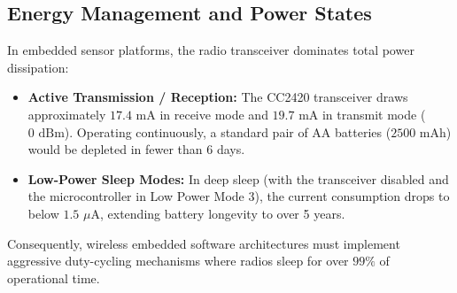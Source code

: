 \begin{table}[htbp]
\centering
\caption{Architectural comparison of embedded wireless sensor and IoT hardware platforms.}
\label{tab:embedded_boards_comparison}
\end{table}

\subsection{Energy Management and Power States}
In embedded sensor platforms, the radio transceiver dominates total power dissipation:
\begin{itemize}
    \item \textbf{Active Transmission / Reception:} The CC2420 transceiver draws approximately $17.4\text{~mA}$ in receive mode and $19.7\text{~mA}$ in transmit mode ($0\text{~dBm}$). Operating continuously, a standard pair of AA batteries ($2500\text{~mAh}$) would be depleted in fewer than 6 days.
    \item \textbf{Low-Power Sleep Modes:} In deep sleep (with the transceiver disabled and the microcontroller in Low Power Mode 3), the current consumption drops to below $1.5\text{~}\mu\text{A}$, extending battery longevity to over 5 years.
\end{itemize}
Consequently, wireless embedded software architectures must implement aggressive duty-cycling mechanisms where radios sleep for over $99\%$ of operational time.


